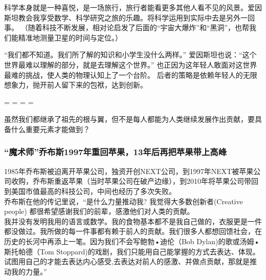 科学本身就是一种喜悦，是一场旅行，旅行者能看更多其他人看不见的风景。爱因斯坦教会我享受数学、科学研究之旅的乐趣。将科学运用到实际中去是另外一回事。
（随着科技不断发展，相对论启发了后面的``宇宙大爆炸''和``黑洞''，也帮我们能精准地测量卫星的时间与定位。）

``我们都不知道。我们所了解的知识和小学生没什么两样。''
爱因斯坦也说：``这个世界最难以理解的部分，就是去理解这个世界。''
也正因为这年轻人敢面对这世界最难的挑战，使人类的物理认知上了一个台阶。
后者的策略是依赖年轻人的无限想象力，抛开前人留下来的包袱，达到创新。

\begin{description}
\tightlist
\item[]
= = = =
\end{description}

虽然我们都继承了祖先的根与翼，但不是每人都能为人类继续发展作出贡献，要具备什么重要元素才能做到？


\hypertarget{ux9b54ux672fux5e08ux4e54ux5e03ux65af1997ux5e74ux91cdux56deux82f9ux679c13ux5e74ux540eux518dux628aux82f9ux679cux5e26ux4e0aux9ad8ux5cf0}{%
\subsubsection{“魔术师”乔布斯1997年重回苹果，13年后再把苹果带上高峰}\label{ux9b54ux672fux5e08ux4e54ux5e03ux65af1997ux5e74ux91cdux56deux82f9ux679c13ux5e74ux540eux518dux628aux82f9ux679cux5e26ux4e0aux9ad8ux5cf0}}

1985年乔布斯被迫离开苹果公司，独资开创NEXT公司，到1997年NEXT被苹果公司收购，乔布斯重返苹果（当时苹果公司在破产边缘），到2010年将苹果公司带回到美国市值最高的科技公司，中间也经历了多次失败。\\
乔布斯在他的传记里说，``是什么力量推动我? 我觉得大多数创新者(Creative
people) 都很希望感谢我们的前辈，感激他们对人类的贡献。\\
我并没有发明我用的语言或数学。我的食物基本都不是我自己做的，衣服更是一件都没做过。我所做的每一件事都有赖于前人的贡献。我们很多人都想回馈社会，在历史的长河中再添上一笔。因为我们不会写鲍勃•迪伦（Bob
Dylan)的歌或汤姆•斯托帕德（Tom
Stoppard)的戏剧，我们只能用自己能掌握的方式去表达、体现。试图用自己的才能去表达内心感受,去表达对前人的感激、并做点贡献，那就是推动我的力量。''

